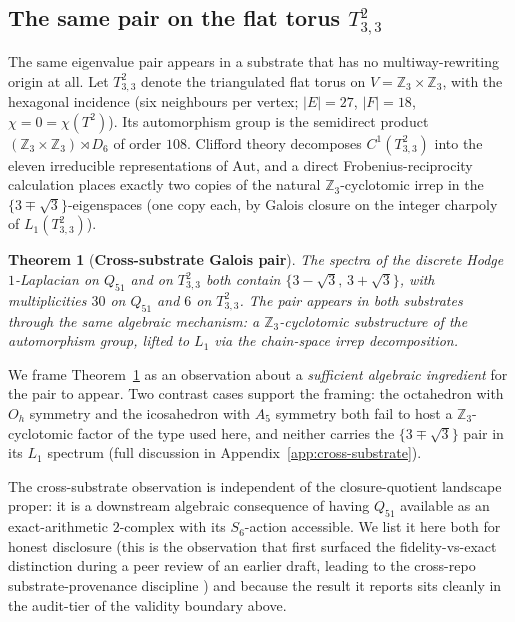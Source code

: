\documentclass[12pt,a4paper]{article}
\newtheorem{theorem}{Theorem}[section]
\theoremstyle{definition}
\theoremstyle{remark}
\newcommand{\bZ}{\mathbb{Z}}
\begin{document}
\subsection{The same pair on the flat torus
$T^2_{3,3}$}\label{sec:galois-torus}

The same eigenvalue pair appears in a substrate that has no
multiway-rewriting origin at all. Let $T^2_{3,3}$ denote the
triangulated flat torus on $V = \bZ_3 \times \bZ_3$, with the hexagonal
incidence (six neighbours per vertex; $|E| = 27$, $|F| = 18$,
$\chi = 0 = \chi(T^2)$). Its automorphism group is the semidirect
product $(\bZ_3 \times \bZ_3) \rtimes D_6$ of order $108$. Clifford
theory decomposes $C^1(T^2_{3,3})$ into the eleven irreducible
representations of $\mathrm{Aut}$, and a direct Frobenius-reciprocity
calculation places exactly two copies of the natural $\bZ_3$-cyclotomic
irrep in the $\{3 \mp \sqrt 3\}$-eigenspaces (one copy each, by Galois
closure on the integer charpoly of $L_1(T^2_{3,3})$).

\begin{theorem}[\textbf{Cross-substrate Galois pair}]\label{thm:galois-cross}
The spectra of the discrete Hodge $1$-Laplacian on $Q_{51}$ and on
$T^2_{3,3}$ both contain $\{3 - \sqrt 3,\, 3 + \sqrt 3\}$, with
multiplicities $30$ on $Q_{51}$ and $6$ on $T^2_{3,3}$. The pair
appears in both substrates through the same algebraic mechanism: a
$\bZ_3$-cyclotomic substructure of the automorphism group, lifted to
$L_1$ via the chain-space irrep decomposition.
\end{theorem}

We frame Theorem~\ref{thm:galois-cross} as an observation about a
\emph{sufficient algebraic ingredient} for the pair to appear. Two
contrast cases support the framing: the octahedron with $O_h$
symmetry and the icosahedron with $A_5$ symmetry both fail to host a
$\bZ_3$-cyclotomic factor of the type used here, and neither carries the
$\{3 \mp \sqrt 3\}$ pair in its $L_1$ spectrum (full discussion in
Appendix~\ref{app:cross-substrate}).

The cross-substrate observation is independent of the closure-quotient
landscape proper: it is a downstream algebraic consequence of having
$Q_{51}$ available as an exact-arithmetic $2$-complex with its
$S_6$-action accessible. We list it here both for honest disclosure
(this is the observation that first surfaced the
fidelity-vs-exact distinction during a peer review of an earlier
draft, leading to the cross-repo substrate-provenance discipline
\cite{tce-substrate-provenance}) and because the result it reports
sits cleanly in the audit-tier of the validity boundary above.
\end{document}
